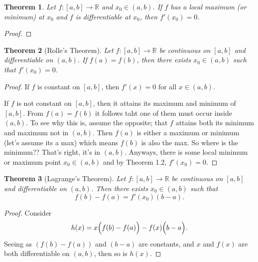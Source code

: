 \documentclass[12pt]{article}
\newtheorem{theorem}{Theorem}[section]
\theoremstyle{definition}
\theoremstyle{definition}
\newcommand{\bigparen}[1]{\Bigl ( #1 \Bigr )}
\begin{document}
    \begin{theorem}
        Let $f:[a, b]\to\mathbb{R}$ and $x_0\in(a, b)$. If $f$ has a local
        maximum (or minimum) at $x_0$ and $f$ is differentiable at $x_0$, then
        $f'(x_0)=0$.
    \end{theorem}
        \begin{proof}
            
        \end{proof}
    \begin{theorem}[\textrm{Rolle's Theorem}]
        Let $f:[a, b]\to \mathbb{R}$ be continuous on $[a, b]$ and
        differentiable on $(a, b)$. If $f(a)=f(b)$, then there exists $x_0\in
        (a, b)$ such that $f'(x_0)=0$.
    \end{theorem}
        \begin{proof}
            If $f$ is constant on $[a, b]$, then $f'(x)=0$ for all $x\in (a,
            b)$.\par If $f$ is not constant on $[a, b]$, then it attains its
            maximum and minimum of $[a, b]$. From $f(a)=f(b)$ it follows taht
            one of them must occur inside $(a, b)$. To see why this is, assume
            the opposite; that $f$ attains both its minimum and maximum not in
            $(a, b)$. Then $f(a)$ is either a maximum or minimum (let's assume
            its a max) which means $f(b)$ is also the max. So where is the
            minimum?? That's right, it's in $(a, b)$. Anyways, there is some
            local minimum or maximum point $x_0\in (a, b)$ and by Theorem 1.2,
            $f'(x_0)=0$.
        \end{proof}
    \begin{theorem}[\textrm{Lagrange's Theorem}]
        Let $f:[a, b]\to\mathbb{R}$ be continuous on $[a, b]$ and
        differentiable on $(a, b)$. Then there exists $x_0\in (a, b)$ such
        that
            \begin{equation*}
                f(b)-f(a)=f'(x_0)(b-a).
            \end{equation*}
    \end{theorem}
        \begin{proof}
            Consider
                \begin{equation*}
                    h(x)=x\bigparen{f(b)-f(a)}-f(x)\bigparen{b-a}.
                \end{equation*}
            Seeing as $(f(b)-f(a))$ and $(b-a)$ are constants, and $x$ and
            $f(x)$ are both differentiable on $(a, b)$, then so is $h(x)$. 
        \end{proof}
\end{document}
